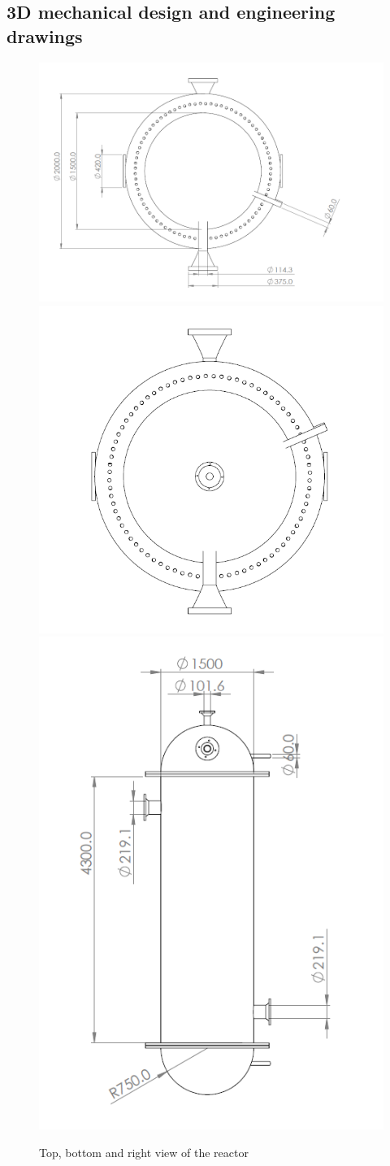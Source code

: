 \subsection{3D mechanical design and engineering drawings}

\begin{figure}[H]
    \centering
    \includegraphics[width=0.6\linewidth]{chapters/2-reaction/figures/FYD reactor bottom view with calc.PNG}
    \includegraphics[width=0.49\linewidth]{chapters/2-reaction/figures/FYD reactor top view.PNG}
    \includegraphics[width=0.49\linewidth]{chapters/2-reaction/figures/FYD reactor right view with calc.PNG}
    \caption{Top, bottom and right view of the reactor}
    \label{fig:reactortopbottomrightview}
\end{figure}

